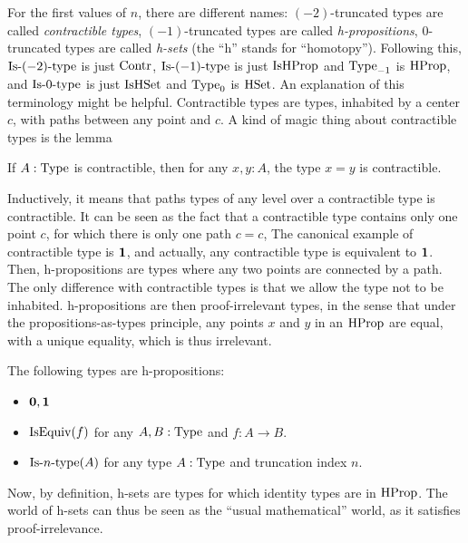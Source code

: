 For the first values of $n$, there are different names:
$(-2)$-truncated types are called {\em contractible types},
$(-1)$-truncated types are called {\em h-propositions},
$0$-truncated types are called {\em h-sets} (the ``h'' stands for ``homotopy''). Following this,
$\mathop{\mathrm{Is{\hbox{-}}}(-2)\mathrm{{\hbox{-}} type}}$ is just $\operatorname{Contr}$, $\mathop{\mathrm{Is{\hbox{-}}}(-1)\mathrm{{\hbox{-}} type}}$ is just $\operatorname{IsHProp}$
and $\operatorname{Type}_{-1}$ is $\operatorname{HProp}$, and $\mathop{\mathrm{Is{\hbox{-}}}0\mathrm{{\hbox{-}} type}}$ is just $\operatorname{IsHSet}$ and
$\operatorname{Type}_0$ is $\operatorname{HSet}$. An explanation of this terminology might be
helpful. Contractible types are types, inhabited by a center $c$, with
paths between any point and $c$. A kind of magic thing about
contractible types is the lemma
\begin{lem}
  If $A:\operatorname{Type}$ is contractible, then for any $x,y:A$, the type $x=y$
  is contractible.
\end{lem}
Inductively, it means that paths types of any level over a contractible
type is contractible. It can be seen as the fact that a contractible
type contains only one point $c$, for which there is only one path
$c=c$, \etc{} The canonical example of contractible type is $\mathbf{1}$,
and actually, any contractible type is equivalent to $\mathbf{1}$.
Then, h-propositions are types where any two points are connected by a
path. The only difference with contractible types is that we allow the
type not to be inhabited. h-propositions are then proof-irrelevant
types, in the sense that under the propositions-as-types principle,
any points $x$ and $y$ in an $\operatorname{HProp}$ are equal, with a unique
equality, which is thus irrelevant.
\begin{lem}
  The following types are h-propositions:
  \begin{itemize}
  \item $\mathbf{0},\mathbf{1}$
  \item $\operatorname{IsEquiv}(f)$ for any $A,B:\operatorname{Type}$ and $f:A\to B$.
  \item $\mathop{\mathrm{Is{\hbox{-}}}n\mathrm{{\hbox{-}} type}}(A)$ for any type $A:\operatorname{Type}$ and truncation index $n$.
  \end{itemize}
\end{lem}
Now, by definition, h-sets are types for which identity types are in
$\operatorname{HProp}$. The world of h-sets can thus be seen as the ``usual
mathematical'' world, as it satisfies proof-irrelevance.

